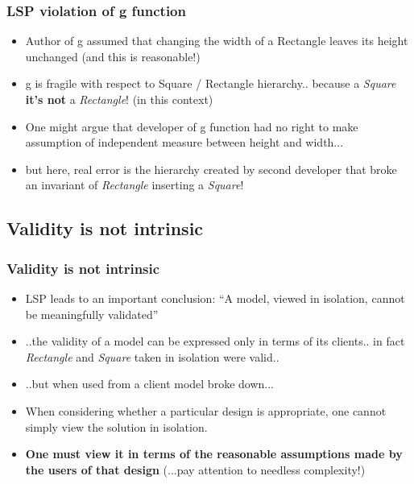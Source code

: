 \documentclass{beamer}
\begin{document}
\begin{frame}
  \frametitle{LSP violation of g function}
  \begin{itemize}
	\item<+-> Author of g assumed that changing the width of a Rectangle leaves its height unchanged (and this is reasonable!)
	\item<+-> g is fragile with respect to Square / Rectangle hierarchy.. because a \textit{Square} \textbf{it's not} a \textit{Rectangle}! (in this context)
	\item<+-> One might argue that developer of g function had no right to make assumption of independent measure between height and width...
	\item<+-> but here, real error is the hierarchy created by second developer that broke an invariant of \textit{Rectangle} inserting a \textit{Square}!
   \end{itemize}
\end{frame}

\subsection{Validity is not intrinsic}
\begin{frame}
  \frametitle{Validity is not intrinsic}
  \begin{itemize}
	\item<+-> LSP leads to an important conclusion: ``A model, viewed in isolation, cannot be meaningfully validated''
	\item<+-> ..the validity of a model can be expressed only in terms of
its clients.. in fact \textit{Rectangle} and \textit{Square} taken in isolation were valid..
	\item<+-> ..but when used from a client model broke down...
	\item<+-> When considering whether a particular design is appropriate, one cannot simply view the solution in isolation.
	\item<+-> \textbf{One must view it in terms of the reasonable assumptions made by the users of that
design} (...pay attention to needless complexity!)
   \end{itemize}
\end{frame}
\end{document}
